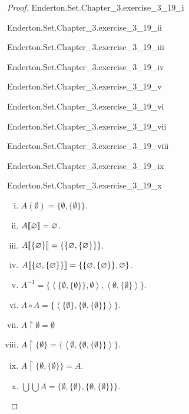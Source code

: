 \documentclass{report}
\begin{document}
\begin{proof}

  \statementpadding

    {Enderton.Set.Chapter\_3.exercise\_3\_19\_i}

    {Enderton.Set.Chapter\_3.exercise\_3\_19\_ii}

    {Enderton.Set.Chapter\_3.exercise\_3\_19\_iii}

    {Enderton.Set.Chapter\_3.exercise\_3\_19\_iv}

    {Enderton.Set.Chapter\_3.exercise\_3\_19\_v}

    {Enderton.Set.Chapter\_3.exercise\_3\_19\_vi}

    {Enderton.Set.Chapter\_3.exercise\_3\_19\_vii}

    {Enderton.Set.Chapter\_3.exercise\_3\_19\_viii}

    {Enderton.Set.Chapter\_3.exercise\_3\_19\_ix}

    {Enderton.Set.Chapter\_3.exercise\_3\_19\_x}

  \begin{enumerate}[(i)]
    \item $A(\emptyset) = \{\emptyset, \{\emptyset\}\}$.
    \item $A\!\left\llbracket\varnothing\right\rrbracket = \varnothing$.
    \item $A\!\left\llbracket\{\varnothing\}\right\rrbracket = \{\{\varnothing, \{\varnothing\}\}\}$.
    \item $A\!\left\llbracket\{\varnothing, \{\varnothing\}\}\right\rrbracket =
      \{\{\varnothing, \{\varnothing\}\}, \varnothing\}$.
    \item $A^{-1} = \{
      \left< \{\emptyset, \{\emptyset\}\}, \emptyset \right>,
      \left< \emptyset, \{\emptyset\} \right>
    \}$.
    \item $A \circ A =
      \{\left< \{\emptyset\}, \{\emptyset, \{\emptyset\}\} \right>\}$.
    \item $A \restriction \emptyset = \emptyset$
    \item $A \restriction \{\emptyset\} =
      \{\left< \emptyset, \{\emptyset, \{\emptyset\}\} \right>\}$.
    \item $A \restriction \{\emptyset, \{\emptyset\}\} = A$.
    \item $\bigcup\bigcup A =
      \{\emptyset, \{\emptyset\}, \{\emptyset, \{\emptyset\}\}\}$.
  \end{enumerate}

\end{proof}
\end{document}
